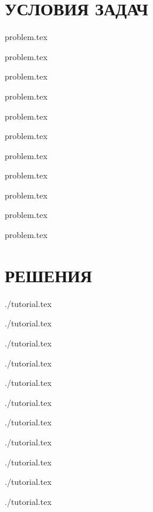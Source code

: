 \documentclass[a5paper, twoside, 11pt]{article}
\begin{document}


\newpage


\pagestyle{fancy}

\newpage
\rm
\thispagestyle{plain}
\section*{УСЛОВИЯ ЗАДАЧ} 

\newcommand{\importproblem}[1]{
\graphicspath{{problems/#1/statements/russian/}}
{problem.tex}	
}

\importproblem{twice}

\importproblem{piston}

\importproblem{apes-king}

\importproblem{carpets}

\importproblem{numeral-system}

\importproblem{search-engine}

\importproblem{lights}

\importproblem{space-battle}

\importproblem{most-dangerous-individual}

\importproblem{air-raid}

\importproblem{graph-ways}


\newpage
{}
\section*{РЕШЕНИЯ} 
\setcounter{subsection}{0}


\newcommand{\importtutorial}[1]{
\graphicspath{{problems/#1/statements/russian/}}
{./tutorial.tex}	
}

\importtutorial{twice}

\importtutorial{piston}

\importtutorial{apes-king}

\importtutorial{carpets}

\importtutorial{numeral-system}

\importtutorial{search-engine}

\importtutorial{lights}

\importtutorial{space-battle}

\importtutorial{most-dangerous-individual}

\importtutorial{air-raid}

\importtutorial{graph-ways}




\end{document}
